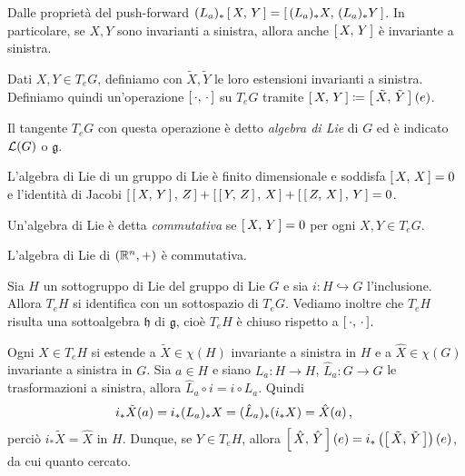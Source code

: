 Dalle proprietà del push-forward $(L_a)_* \left[\,X,\,Y\,\right] = \left[\,(L_a)_*X,\,(L_a)_*Y\,\right]$. In particolare, se $X,Y$ sono invarianti a sinistra, allora anche $\left[\,X,\,Y\,\right]$ è invariante a sinistra.

Dati $X,Y \in T_eG$, definiamo con $\tilde X,\tilde Y$ le loro estensioni invarianti a sinistra.
Definiamo quindi un'operazione $\left[\,\cdot,\,\cdot\,\right]$ su $T_eG$ tramite $\left[\,X,\,Y\,\right] \coloneqq \left[\,\tilde X,\,\tilde Y\,\right](e)$. %

\begin{definition} 
	Il tangente $T_eG$ con questa operazione è detto \emph{algebra di Lie} di $G$ ed è indicato $\mathcal L(G)$ o $\mathfrak g$.
\end{definition}

L'algebra di Lie di un gruppo di Lie è finito dimensionale e soddisfa $\left[\,X,\,X\,\right] = 0$ e l'identità di Jacobi $\left[\,\left[\,X,\,Y\,\right],\,Z\,\right] + \left[\,\left[\,Y,\,Z\,\right],\,X\,\right] + \left[\,\left[\,Z,\,X\,\right],\,Y\,\right] = 0$.


\begin{definition} 
	Un'algebra di Lie è detta \emph{commutativa} se $\left[\,X,\,Y\,\right] = 0$ per ogni $X,Y \in T_eG$.
\end{definition}

\begin{remark}
	L'algebra di Lie di $(\mathbb R^n,+)$ è commutativa.
\end{remark}


Sia $H$ un sottogruppo di Lie del gruppo di Lie $G$ e sia $i: H \hookrightarrow G$ l'inclusione. Allora $T_eH$ si identifica con un sottospazio di $T_eG$. Vediamo inoltre che $T_eH$ risulta una sottoalgebra $\mathfrak h$ di $\mathfrak g$, cioè $T_eH$ è chiuso rispetto a $\left[\,\cdot,\,\cdot\,\right]$.


Ogni $X \in T_eH$ si estende a $\tilde X \in \chi(H)$ invariante a sinistra in $H$ e a $\hat X \in \chi(G)$ invariante a sinistra in $G$.
Sia $a\in H$ e siano $L_a:H\to H$, $\hat L_a:G \to G$ le trasformazioni a sinistra, allora $\hat L_a \circ i = i \circ L_a$. Quindi
\begin{equation*}
i_* \tilde X(a) = i_* (L_a)_* X = (\hat L_a)_* (i_* X) = \hat X(a)\, \text{, }
\end{equation*}
perciò $i_* \tilde X = \hat X$ in $H$.
Dunque, se $Y \in T_eH$, allora $\left[\,\hat X,\,\hat Y\,\right](e) = i_*\left( \left[\,\tilde X,\,\tilde Y\,\right]\right)(e)$, da cui quanto cercato.

